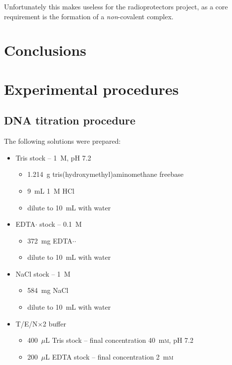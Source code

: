 \begin{refsection}
\begin{figure}
\end{figure}

Unfortunately this makes  useless for the radioprotectors project, as a core requirement is the formation of a \emph{non}-covalent complex.

\section{Conclusions}

\section{Experimental procedures}

\subsection{DNA titration procedure}\label{sec:buffers}
The following solutions were prepared:
\begin{itemize}
    \item Tris stock -- 1~\textsc{M}, pH 7.2
    \begin{itemize}
        \item 1.214~g tris(hydroxymethyl)aminomethane freebase
        \item 9~mL 1~\textsc{M} HCl
        \item dilute to 10~mL with water
    \end{itemize}
    \item EDTA$\cdot$ stock -- 0.1~\textsc{M}
    \begin{itemize}
        \item 372~mg EDTA$\cdot$$\cdot$
        \item dilute to 10~mL with water
    \end{itemize}
    \item NaCl stock -- 1~\textsc{M}
    \begin{itemize}
        \item 584~mg NaCl
        \item dilute to 10~mL with water
    \end{itemize}
    \item T/E/N$\times$2 buffer
    \begin{itemize}
        \item 400~$\mu$L Tris stock -- final concentration 40~m\textsc{m}, pH 7.2
        \item 200~$\mu$L EDTA stock -- final concentration 2~m\textsc{m}

\end{itemize}
\end{itemize}
\end{refsection}
